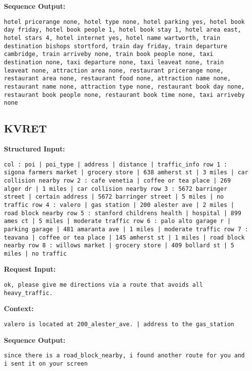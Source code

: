 \documentclass[11pt]{article}
\begin{document}
\textbf{Sequence Output:} 
\begin{lstlisting}
hotel pricerange none, hotel type none, hotel parking yes, hotel book day friday, hotel book people 1, hotel book stay 1, hotel area east, hotel stars 4, hotel internet yes, hotel name wartworth, train destination bishops stortford, train day friday, train departure cambridge, train arriveby none, train book people none, taxi destination none, taxi departure none, taxi leaveat none, train leaveat none, attraction area none, restaurant pricerange none, restaurant area none, restaurant food none, attraction name none, restaurant name none, attraction type none, restaurant book day none, restaurant book people none, restaurant book time none, taxi arriveby none
\end{lstlisting}

\subsection{KVRET}
\textbf{Structured Input:} 
\begin{lstlisting}
col : poi | poi_type | address | distance | traffic_info row 1 : sigona farmers market | grocery store | 638 amherst st | 3 miles | car collision nearby row 2 : cafe venetia | coffee or tea place | 269 alger dr | 1 miles | car collision nearby row 3 : 5672 barringer street | certain address | 5672 barringer street | 5 miles | no traffic row 4 : valero | gas station | 200 alester ave | 2 miles | road block nearby row 5 : stanford childrens health | hospital | 899 ames ct | 5 miles | moderate traffic row 6 : palo alto garage r | parking garage | 481 amaranta ave | 1 miles | moderate traffic row 7 : teavana | coffee or tea place | 145 amherst st | 1 miles | road block nearby row 8 : willows market | grocery store | 409 bollard st | 5 miles | no traffic
\end{lstlisting}
\textbf{Request Input:} 
\begin{lstlisting}
ok, please give me directions via a route that avoids all heavy_traffic.
\end{lstlisting}
\textbf{Context:} \begin{lstlisting}
valero is located at 200_alester_ave. | address to the gas_station
\end{lstlisting}
\textbf{Sequence Output:} 
\begin{lstlisting}
since there is a road_block_nearby, i found another route for you and i sent it on your screen
\end{lstlisting}
\end{document}
